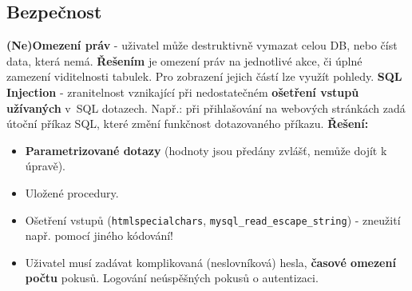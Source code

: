 \subsection{Bezpečnost}
\textbf{(Ne)Omezení práv} - uživatel může destruktivně vymazat celou DB, nebo číst data, která nemá. \textbf{Řešením} je omezení práv na jednotlivé akce, či úplné zamezení viditelnosti tabulek. Pro zobrazení jejich částí lze využít pohledy.
\textbf{SQL Injection} - zranitelnost vznikající při nedostatečném \textbf{ošetření vstupů užívaných} v SQL dotazech. Např.: při přihlašování na webových stránkách zadá útoční příkaz SQL, které změní funkčnost dotazovaného příkazu. \textbf{Řešení:}
\begin{itemize}
\item \textbf{Parametrizované dotazy} (hodnoty jsou předány zvlášť, nemůže dojít k úpravě).
\item Uložené procedury.
\item Ošetření vstupů (\texttt{htmlspecialchars}, \texttt{mysql\_read\_escape\_string}) - zneužití např. pomocí jiného kódování!
\item Uživatel musí zadávat komplikovaná (neslovníková) hesla, \textbf{časové omezení počtu} pokusů. Logování neúspěšných pokusů o autentizaci.
\end{itemize}
